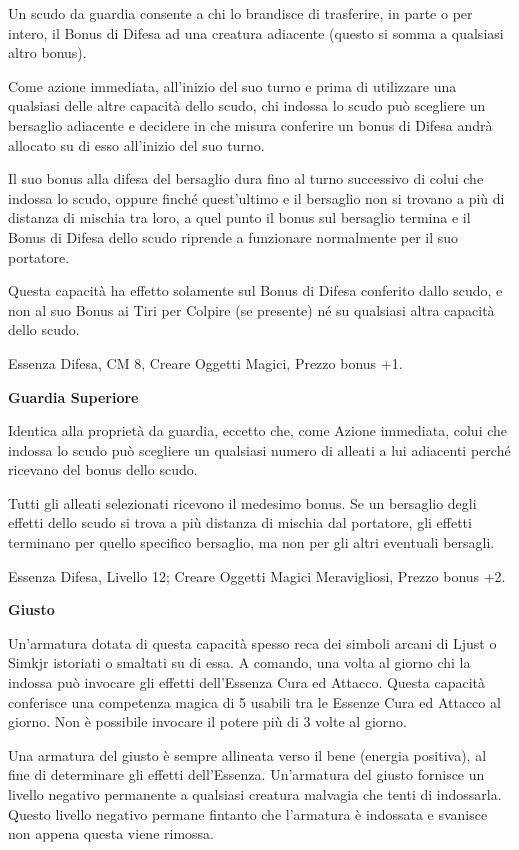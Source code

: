 \documentclass[a4paper,11pt,twoside,openany]{book}
\begin{document}
{Un scudo da guardia consente a chi lo brandisce di trasferire, in parte o per intero, il Bonus di Difesa ad una creatura adiacente (questo si somma a qualsiasi altro bonus). 

Come azione immediata, all'inizio del suo turno e prima di utilizzare una qualsiasi delle altre capacità dello scudo, chi indossa lo scudo può scegliere un bersaglio adiacente e decidere in che misura conferire un bonus di Difesa andrà allocato su di esso all'inizio del suo turno.

Il suo bonus alla difesa del bersaglio dura fino al turno successivo di colui che indossa lo scudo, oppure finché quest'ultimo e il bersaglio non si trovano a più di distanza di mischia tra loro, a quel punto il bonus sul bersaglio termina e il Bonus di Difesa dello scudo riprende a funzionare normalmente per il suo portatore.

Questa capacità ha effetto solamente sul Bonus di Difesa conferito dallo scudo, e non al suo Bonus ai Tiri per Colpire (se presente) né su qualsiasi altra capacità dello scudo.

Essenza Difesa, CM 8, Creare Oggetti Magici, Prezzo bonus +1.

\textbf{Guardia Superiore}

Identica alla proprietà da guardia, eccetto che, come Azione immediata, colui che indossa lo scudo può scegliere un qualsiasi numero di alleati a lui adiacenti perché ricevano del bonus dello scudo. 

Tutti gli alleati selezionati ricevono il medesimo bonus. Se un bersaglio degli effetti dello scudo si trova a più distanza di mischia dal portatore, gli effetti terminano per quello specifico bersaglio, ma non per gli altri eventuali bersagli.

Essenza Difesa, Livello 12; Creare Oggetti Magici Meravigliosi, Prezzo bonus +2.

\textbf{Giusto}

Un'armatura dotata di questa capacità spesso reca dei simboli arcani di Ljust o Simkjr istoriati o smaltati su di essa. A comando, una volta al giorno chi la indossa può invocare gli effetti dell'Essenza Cura ed Attacco. Questa capacità conferisce una competenza magica di 5 usabili tra le Essenze Cura ed Attacco al giorno. Non è possibile invocare il potere più di 3 volte al giorno.

Una armatura del giusto è sempre allineata verso il bene (energia positiva), al fine di determinare gli effetti dell'Essenza. Un'armatura del giusto fornisce un livello negativo permanente a qualsiasi creatura malvagia che tenti di indossarla. Questo livello negativo permane fintanto che l'armatura è indossata e svanisce non appena questa viene rimossa.

}
\end{document}
